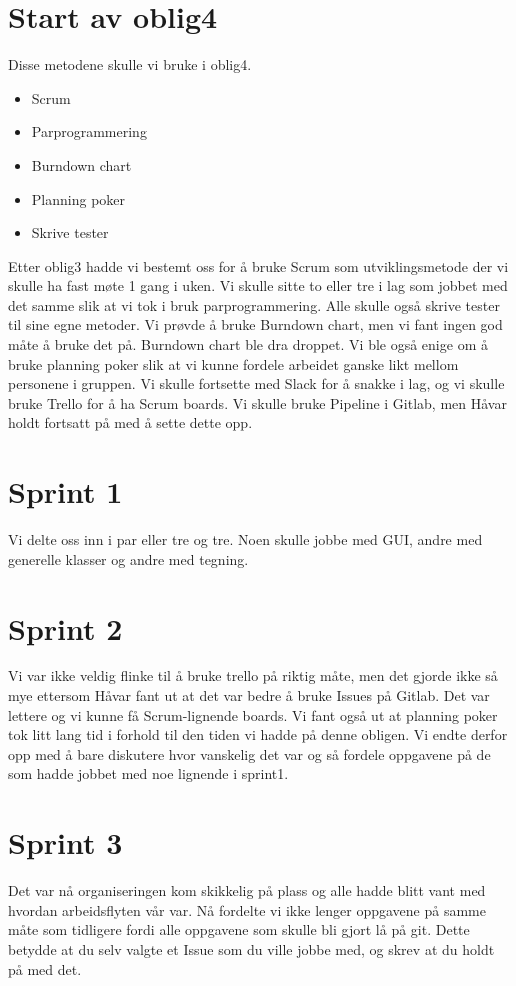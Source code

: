 \documentclass[11pt]{article}
\begin{document}
\section*{Start av oblig4}
Disse metodene skulle vi bruke i oblig4.
\begin{itemize}
\item Scrum
\item Parprogrammering
\item Burndown chart
\item Planning poker
\item Skrive tester
\end{itemize}


Etter oblig3 hadde vi bestemt oss for å bruke Scrum som utviklingsmetode der vi skulle ha fast møte 1 gang i uken.
Vi skulle sitte to eller tre i lag som jobbet med det samme slik at vi tok i bruk parprogrammering.
Alle skulle også skrive tester til sine egne metoder. 
Vi prøvde å bruke Burndown chart, men vi fant ingen god måte å bruke det på. 
Burndown chart ble dra droppet. Vi ble også enige om å bruke planning poker slik at vi kunne fordele arbeidet ganske likt mellom personene i gruppen.
Vi skulle fortsette med Slack for å snakke i lag, og vi skulle bruke Trello for å ha Scrum boards. 
Vi skulle bruke Pipeline i Gitlab, men Håvar holdt fortsatt på med å sette dette
opp.

\section*{Sprint 1}
Vi delte oss inn i par eller tre og tre. Noen skulle jobbe med GUI, andre med generelle klasser og andre med tegning.

\section*{Sprint 2}
Vi var ikke veldig flinke til å bruke trello på riktig måte, men det gjorde ikke så mye ettersom Håvar fant ut at det var bedre å bruke Issues på Gitlab. Det var lettere og vi kunne få Scrum-lignende boards. 
Vi fant også ut at planning poker tok litt lang tid i forhold til den tiden vi hadde på denne obligen. Vi endte derfor opp med å bare diskutere hvor vanskelig det var og så fordele oppgavene på de som hadde jobbet med noe lignende i sprint1.

\section*{Sprint 3}
Det var nå organiseringen kom skikkelig på plass og alle hadde blitt vant med hvordan arbeidsflyten vår var. Nå fordelte vi ikke lenger oppgavene på samme måte som tidligere fordi alle oppgavene som skulle bli gjort lå på git. 
Dette betydde at du selv valgte et Issue som du ville jobbe med, og skrev at du holdt på med det.
\end{document}
